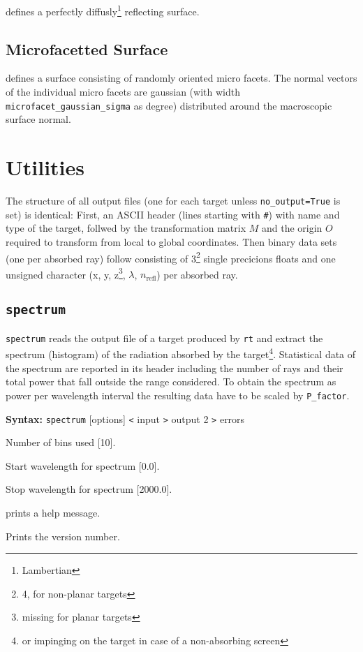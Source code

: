 \documentclass[10pt,a4paper,titlepage]{article}
\newcommand{\rt}{{\tt rt} }
\begin{document}
 defines a perfectly diffusly\footnote{Lambertian} reflecting surface.

\subsection{Microfacetted Surface}

 defines a surface consisting of randomly oriented micro facets. The normal vectors of the individual micro facets are gaussian (with width {\tt microfacet\_gaussian\_sigma} as degree) distributed around the macroscopic surface normal.



\section{Utilities}

The structure of all output files (one for each target unless {\tt no\_output=True} is set) is identical: First, an ASCII header (lines starting with {\tt \#}) with name and type of the target, follwed by the transformation matrix $M$ and the origin $O$ required to transform from local to global coordinates. Then binary data sets (one per absorbed ray) follow consisting of 3\footnote{4, for non-planar targets} single precicions floats and one unsigned character (x, y, z\footnote{missing for planar targets}, $\lambda$, $n_{\mathrm{refl}}$) per absorbed ray.   

\subsection{{\tt spectrum}}

{\tt spectrum} reads the output file of a target produced by \rt and extract the spectrum (histogram) of the radiation absorbed by the target\footnote{or impinging on the target in case of a non-absorbing screen}. Statistical data of the spectrum are reported in its header including the number of rays and their total power that fall outside the range considered. To obtain the spectrum as power per wavelength interval the resulting data have to be scaled by {\tt P\_factor}.

{\bf Syntax:} {\tt spectrum} [options] {\tt <} input {\tt >} output 2 {\tt >} errors
\vspace{1em}
\begin{list}{}
{\setlength{\leftmargin}{3.5cm}
\setlength{\labelwidth}{3.0cm}
\setlength{\labelsep}{0.25cm}
\setlength{\rightmargin}{0.5cm}}

\item[{\tt [--num|-n]}] Number of bins used [10].
\item[{\tt [--start|-a]}] Start wavelength for spectrum [0.0].
\item[{\tt [--stop|-o]}] Stop wavelength for spectrum [2000.0].
\item[{\tt [--help|-h]}] prints a help message.
\item[{\tt [--Version|-V]}] Prints the version number.

\end{list}
\end{document}
